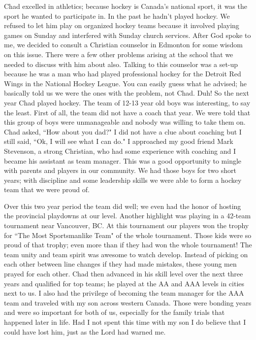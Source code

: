 \documentclass[oneside]{book}
\begin{document}
Chad excelled in athletics; because hockey is Canada's national sport, it was the sport he wanted to participate in. In the past he hadn't played hockey. We refused to let him play on organized hockey teams because it involved playing games on Sunday and interfered with Sunday church services. After God spoke to me, we decided to consult a Christian counselor in Edmonton for some wisdom on this issue. There were a few other problems arising at the school that we needed to discuss with him about also. Talking to this counselor was a set-up because he was a man who had played professional hockey for the Detroit Red Wings in the National Hockey League. You can easily guess what he advised; he basically told us we were the ones with the problem, not Chad. Duh! So the next year Chad played hockey. The team of 12-13 year old boys was interesting, to say the least. First of all, the team did not have a coach that year. We were told that this group of boys were unmanageable and nobody was willing to take them on. Chad asked, ``How about you dad?" I did not have a clue about coaching but I still said, ``Ok, I will see what I can do." I approached my good friend Mark Stevenson, a strong Christian, who had some experience with coaching and I became his assistant as team manager. This was a good opportunity to mingle with parents and players in our community. We had those boys for two short years; with discipline and some leadership skills we were able to form a hockey team that we were proud of.

Over this two year period the team did well; we even had the honor of hosting the provincial playdowns at our level. Another highlight was playing in a 42-team tournament near Vancouver, BC. At this tournament our players won the trophy for ``The Most Sportsmanlike Team" of the whole tournament. Those kids were so proud of that trophy; even more than if they had won the whole tournament! The team unity and team spirit was awesome to watch develop. Instead of picking on each other between line changes if they had made mistakes, these young men prayed for each other. Chad then advanced in his skill level over the next three years and qualified for top teams; he played at the AA and AAA levels in cities next to us. I also had the privilege of becoming the team manager for the AAA team and traveled with my son across western Canada. Those were bonding years and were so important for both of us, especially for the family trials that happened later in life. Had I not spent this time with my son I do believe that I could have lost him, just as the Lord had warned me.
\end{document}
